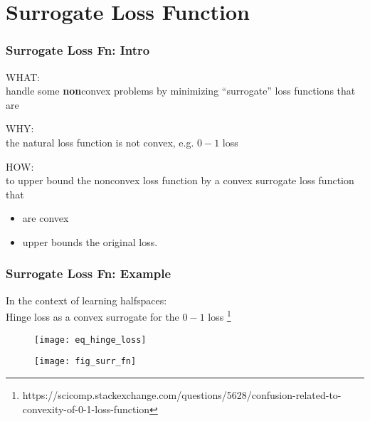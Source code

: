 \section{Surrogate Loss Function}

\begin{frame}
\frametitle{Surrogate Loss Fn: Intro}

WHAT:\\
handle some \textbf{non}convex problems
by minimizing ``surrogate'' loss functions that are 
\vspace{4mm}

WHY:\\
the natural loss function is not convex, e.g.  $0-1$ loss
\vspace{4mm}

HOW:\\
to upper bound the nonconvex loss function by a convex surrogate loss function
that
\begin{itemize}
    \item are convex
    \item upper bounds the original loss.
\end{itemize}
\end{frame}

\begin{frame}
\frametitle{Surrogate Loss Fn: Example}
In the context of learning halfspaces:\\
Hinge loss as a convex surrogate for the $0-1$ loss
\footnote{{\tiny https://scicomp.stackexchange.com/questions/5628/confusion-related-to-convexity-of-0-1-loss-function}}

\begin{figure}
    \centering
    \texttt{[image: eq\_hinge\_loss]}
\end{figure}

\begin{figure}
    \centering
    \texttt{[image: fig\_surr\_fn]}
\end{figure}

\end{frame}




